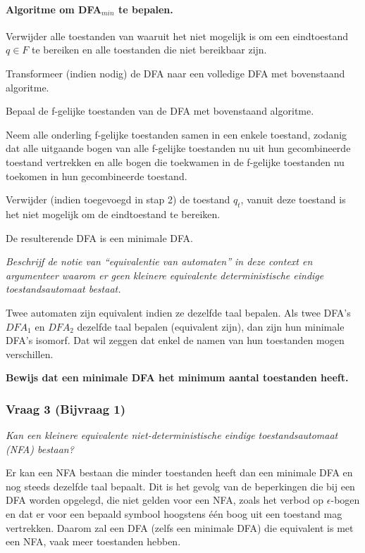 \paragraph{Algoritme om DFA$_{min}$ te bepalen.}
\begin{enumalgo}
  \item Verwijder alle toestanden van waaruit het niet mogelijk is om een eindtoestand $q \in F$ te bereiken en alle toestanden die niet bereikbaar zijn.
  \item Transformeer (indien nodig) de DFA naar een volledige DFA met bovenstaand algoritme.
  \item Bepaal de f-gelijke toestanden van de DFA met bovenstaand algoritme.
  \item Neem alle onderling f-gelijke toestanden samen in een enkele toestand, zodanig dat alle uitgaande bogen van alle f-gelijke toestanden nu uit hun gecombineerde toestand vertrekken en alle bogen die toekwamen in de f-gelijke toestanden nu toekomen in hun gecombineerde toestand.
  \item Verwijder (indien toegevoegd in stap 2) de toestand $q_t$, vanuit deze toestand is het niet mogelijk om de eindtoestand te bereiken.
  \end{enumalgo}
  De resulterende DFA is een minimale DFA.

\textit{Beschrijf de notie van ``equivalentie van automaten'' in deze context en argumenteer waarom er geen kleinere equivalente deterministische eindige toestandsautomaat bestaat.}

Twee automaten zijn equivalent indien ze dezelfde taal bepalen. Als twee DFA's $DFA_1$ en $DFA_2$ dezelfde taal bepalen (equivalent zijn), dan zijn hun minimale DFA's isomorf. Dat wil zeggen dat enkel de namen van hun toestanden mogen verschillen.

\textbf{Bewijs dat een minimale DFA het minimum aantal toestanden heeft.} 

\subsubsection{Vraag 3 (Bijvraag 1)}

\textit{Kan een kleinere equivalente niet-deterministische eindige toestandsautomaat (NFA) bestaan?}

Er kan een NFA bestaan die minder toestanden heeft dan een minimale DFA en nog steeds dezelfde taal bepaalt. Dit is het gevolg van de beperkingen die bij een DFA worden opgelegd, die niet gelden voor een NFA, zoals het verbod op $\epsilon$-bogen en dat er voor een bepaald symbool hoogstens \'e\'en boog uit een toestand mag vertrekken. Daarom zal een DFA (zelfs een minimale DFA) die equivalent is met een NFA, vaak meer toestanden hebben.

